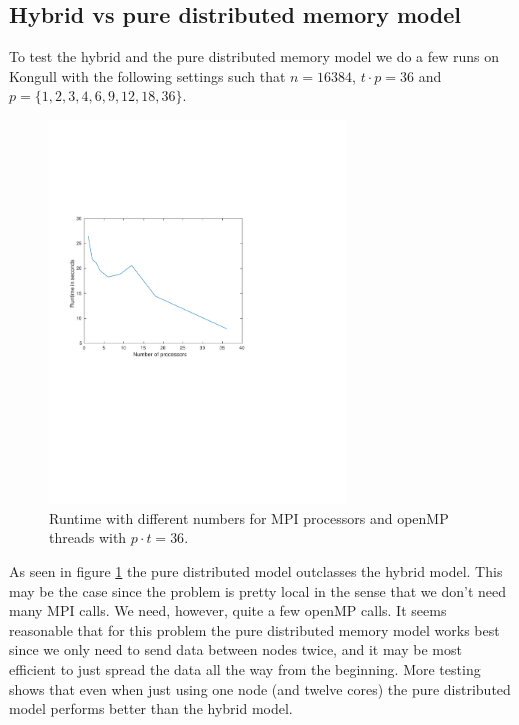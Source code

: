 \subsection*{Hybrid vs pure distributed memory model}
To test the hybrid and the pure distributed memory model we do a few runs on Kongull with the following settings such that $n = 16384$,  $t\cdot p = 36$ and $p = \{1, 2, 3, 4, 6, 9, 12, 18, 36\}$.
\begin{figure}
\centering
\includegraphics[width=0.7\textwidth]{./figures/runtime}
\caption{Runtime with different numbers for MPI processors and openMP threads with $p\cdot t = 36$.}
\label{fig:runtime}
\end{figure}
As seen in figure \ref{fig:runtime} the pure distributed model outclasses the hybrid model. This may be the case since the problem is pretty local in the sense that we don't need many MPI calls. We need, however, quite a few openMP calls. It seems reasonable that for this problem the pure distributed memory model works best since we only need to send data between nodes twice, and it may be most efficient to just spread the data all the way from the beginning. More testing shows that even when just using one node (and twelve cores) the pure distributed model performs better than the hybrid model.


